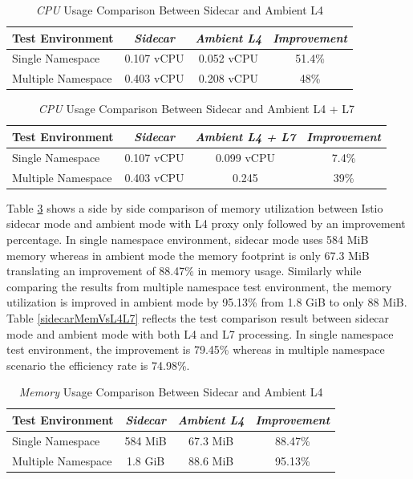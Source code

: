 \begin{table}[ht!]
  \centering
  \begin{tabular}{ |l|c|c|c| }
    \hline
    \textbf{Test Environment} & \textbf{\textit{Sidecar}} & \textbf{\textit{Ambient L4}} & \textbf{\textit{Improvement}}\\ \hline
    Single Namespace & 0.107 vCPU & 0.052 vCPU & 51.4\% \\ \hline
    Multiple Namespace & 0.403 vCPU & 0.208 vCPU & 48\% \\ \hline
  \end{tabular}
  \caption{\textit{CPU} Usage Comparison Between Sidecar and Ambient L4}
  \label{sidecarCpuVsL4}
\end{table}


\begin{table}[ht!]
  \centering
  \begin{tabular}{ |l|c|c|c| }
    \hline
    \textbf{Test Environment} & \textbf{\textit{Sidecar}} & \textbf{\textit{Ambient L4 + L7}} & \textbf{\textit{Improvement}}\\ \hline
    Single Namespace & 0.107 vCPU & 0.099 vCPU & 7.4\% \\ \hline
    Multiple Namespace & 0.403 vCPU & 0.245 & 39\% \\ \hline
  \end{tabular}
  \caption{\textit{CPU} Usage Comparison Between Sidecar and Ambient L4 + L7}
  \label{sidecarCpuVsL4L7}
\end{table}

Table \ref{sidecarMemVsL4} shows a side by side comparison of memory utilization between Istio sidecar mode and ambient mode with L4 proxy only followed by an improvement percentage. In single namespace environment, sidecar mode uses 584 MiB memory whereas in ambient mode the memory footprint is only 67.3 MiB translating an improvement of 88.47\% in memory usage. Similarly while comparing the results from multiple namespace test environment, the memory utilization is improved in ambient mode by 95.13\% from 1.8 GiB to only 88 MiB. Table \ref{sidecarMemVsL4L7} reflects the test comparison result between sidecar mode and ambient mode with both L4 and L7 processing. In single namespace test environment, the improvement is 79.45\% whereas in multiple namespace scenario the efficiency rate is 74.98\%.

\begin{table}[ht!]
  \centering
  \begin{tabular}{ |l|c|c|c| }
    \hline
    \textbf{Test Environment} & \textbf{\textit{Sidecar}} & \textbf{\textit{Ambient L4}} & \textbf{\textit{Improvement}}\\ \hline
    Single Namespace & 584 MiB & 67.3 MiB & 88.47\% \\ \hline
    Multiple Namespace & 1.8 GiB & 88.6 MiB & 95.13\% \\ \hline
  \end{tabular}
  \caption{\textit{Memory} Usage Comparison Between Sidecar and Ambient L4}
  \label{sidecarMemVsL4}
\end{table}


